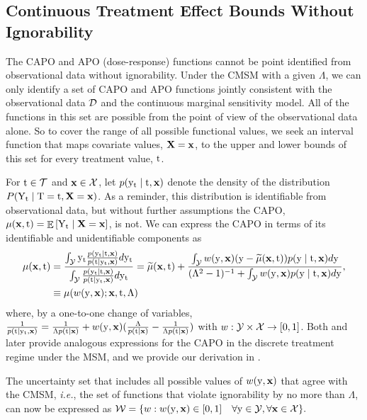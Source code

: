 \subsection{Continuous Treatment Effect Bounds Without Ignorability}
\label{sec:bounds}
The CAPO and APO (dose-response) functions cannot be point identified from observational data without ignorability.
Under the CMSM with a given $\Lambda$, we can only identify a set of CAPO and APO functions jointly consistent with the observational data $\mathcal{D}$ and the continuous marginal sensitivity model.
All of the functions in this set are possible from the point of view of the observational data alone. 
So to cover the range of all possible functional values, we seek an interval function that maps covariate values, $\mathbf{X}=\mathbf{x}$, to the upper and lower bounds of this set for every treatment value, $\mathrm{t}$.

For $\mathrm{t} \in \mathcal{T}$ and $\mathbf{x} \in \mathcal{X}$, let $p(\mathrm{y}_{\mathrm{t}} \mid \mathrm{t}, \mathbf{x})$ denote the density of the distribution $P(\mathrm{Y}_{\mathrm{t}} \mid \mathrm{T}=\mathrm{t}, \mathbf{X}=\mathbf{x})$.
As a reminder, this distribution is identifiable from observational data, but without further assumptions the CAPO, $\mu(\mathbf{x}, \mathrm{t}) = \mathop{\mathbb{E}}\left[ \mathrm{Y}_{\mathrm{t}} \mid \mathbf{X} = \mathbf{x} \right]$, is not.
We can express the CAPO in terms of its identifiable and unidentifiable components as
\begin{equation}
    \begin{split}
        \mu(\mathbf{x}, \mathrm{t})
        &= \frac{\int_{\mathcal{Y}} \mathrm{y}_{\mathrm{t}} \frac{p(\mathrm{y}_{\mathrm{t}} \mid \mathrm{t}, \mathbf{x})}{p(\mathrm{t} \mid \mathrm{y}_{\mathrm{t}}, \mathbf{x})}d\mathrm{y}_{\mathrm{t}}}{\int_{\mathcal{Y}} \frac{p(\mathrm{y}_{\mathrm{t}} \mid \mathrm{t}, \mathbf{x})}{p(\mathrm{t} \mid \mathrm{y}_{\mathrm{t}}, \mathbf{x})} d\mathrm{y}_{\mathrm{t}}}
        = \widetilde{\mu}(\mathbf{x}, \mathrm{t}) + \frac{\int_{\mathcal{Y}} w(\mathrm{y}, \mathbf{x}) (\mathrm{y} - \widetilde{\mu}(\mathbf{x}, \mathrm{t})) p(\mathrm{y} \mid \mathrm{t}, \mathbf{x})d\mathrm{y}}{(\Lambda^2 - 1)^{-1} + \int_{\mathcal{Y}} w(\mathrm{y}, \mathbf{x})p(\mathrm{y} \mid \mathrm{t}, \mathbf{x})d\mathrm{y}}, \\
        &\equiv \mu(w(\mathrm{y}, \mathbf{x}); \mathbf{x}, \mathrm{t}, \Lambda)
    \end{split}
    \label{eq:mu_w}
\end{equation}
where, by a one-to-one change of variables, $\frac{1}{p(\mathrm{t} \mid \mathrm{y}_{\mathrm{t}}, \mathbf{x})} = \frac{1}{\Lambda p(\mathrm{t} \mid \mathbf{x})} + w(\mathrm{y}, \mathbf{x}) (\frac{\Lambda}{p(\mathrm{t} \mid \mathbf{x})} - \frac{1}{\Lambda p(\mathrm{t} \mid \mathbf{x})})$ with $w : \mathcal{Y}\times \mathcal{X} \to [0, 1]$.
Both \cite{kallus2019interval} and later \cite{jesson2021quantifying} provide analogous expressions for the CAPO in the discrete treatment regime under the MSM, and we provide our derivation in . 

The uncertainty set that includes all possible values of $w(\mathrm{y}, \mathbf{x})$ that agree with the CMSM, \emph{i.e.}, the set of functions that violate ignorability by no more than $\Lambda$, can now be expressed as 
$
    \mathcal{W} = \{w: w(\mathrm{y}, \mathbf{x}) \in [ 0, 1 ] \quad \forall \mathrm{y} \in \mathcal{Y},  \forall \mathbf{x} \in \mathcal{X} \}.
$

